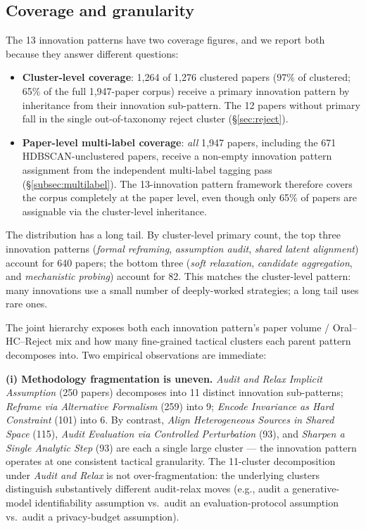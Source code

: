 \documentclass[10pt,a4paper]{article}
\begin{document}
\subsection{Coverage and granularity}

The 13 innovation patterns have two coverage figures, and we report both because they answer different questions:
\begin{itemize}[leftmargin=1.4em, topsep=2pt, itemsep=2pt]
\item \textbf{Cluster-level coverage}: 1{,}264 of 1{,}276 clustered papers (97\% of clustered; 65\% of the full 1{,}947-paper corpus) receive a primary innovation pattern by inheritance from their innovation sub-pattern. The 12 papers without primary fall in the single out-of-taxonomy reject cluster (\S\ref{sec:reject}).
\item \textbf{Paper-level multi-label coverage}: \emph{all} 1{,}947 papers, including the 671 HDBSCAN-unclustered papers, receive a non-empty innovation pattern assignment from the independent multi-label tagging pass (\S\ref{subsec:multilabel}). The 13-innovation pattern framework therefore covers the corpus completely at the paper level, even though only 65\% of papers are assignable via the cluster-level inheritance.
\end{itemize}
The distribution has a long tail. By cluster-level primary count, the top three innovation patterns (\emph{formal reframing}, \emph{assumption audit}, \emph{shared latent alignment}) account for 640 papers; the bottom three (\emph{soft relaxation}, \emph{candidate aggregation}, and \emph{mechanistic probing}) account for 82. This matches the cluster-level pattern: many innovations use a small number of deeply-worked strategies; a long tail uses rare ones.

The joint hierarchy exposes both each innovation pattern's paper volume / Oral--HC--Reject mix and how many fine-grained tactical clusters each parent pattern decomposes into. Two empirical observations are immediate:

\textbf{(i) Methodology fragmentation is uneven.} \emph{Audit and Relax Implicit Assumption} (250 papers) decomposes into 11 distinct innovation sub-patterns; \emph{Reframe via Alternative Formalism} (259) into 9; \emph{Encode Invariance as Hard Constraint} (101) into 6. By contrast, \emph{Align Heterogeneous Sources in Shared Space} (115), \emph{Audit Evaluation via Controlled Perturbation} (93), and \emph{Sharpen a Single Analytic Step} (93) are each a single large cluster --- the innovation pattern operates at one consistent tactical granularity. The 11-cluster decomposition under \emph{Audit and Relax} is not over-fragmentation: the underlying clusters distinguish substantively different audit-relax moves (e.g., audit a generative-model identifiability assumption vs.\ audit an evaluation-protocol assumption vs.\ audit a privacy-budget assumption).
\end{document}
